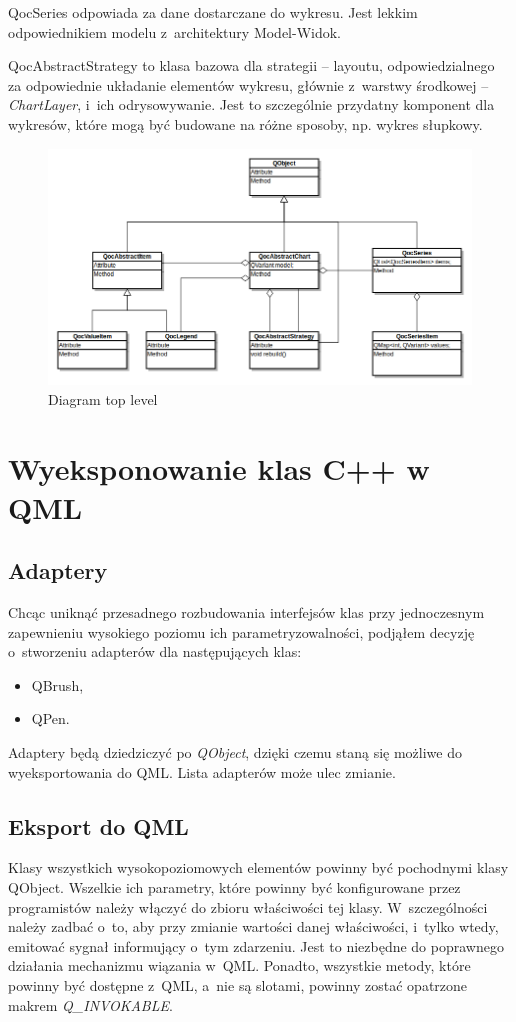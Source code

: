 QocSeries odpowiada za dane dostarczane do wykresu. Jest lekkim odpowiednikiem modelu z~architektury Model-Widok.

QocAbstractStrategy to klasa bazowa dla strategii -- layoutu, odpowiedzialnego za odpowiednie układanie elementów wykresu, głównie z~warstwy środkowej -- \textit{ChartLayer}, i~ich odrysowywanie. Jest to szczególnie przydatny komponent dla wykresów, które mogą być budowane na różne sposoby, np. wykres słupkowy.


\begin{figure}
\centering
\caption{Diagram top level}\label{rys:klasy:top_level}
\includegraphics[scale=0.5]{img/klasy-top_level.png}
\end{figure}


\section{Wyeksponowanie klas C++ w QML}
\subsection{Adaptery}
Chcąc uniknąć przesadnego rozbudowania interfejsów klas przy jednoczesnym zapewnieniu wysokiego poziomu ich parametryzowalności, podjąłem decyzję o~stworzeniu adapterów dla następujących klas:
\begin{itemize}  
\item{QBrush,}
\item{QPen.}
\end{itemize}
Adaptery będą dziedziczyć po \textit{QObject}, dzięki czemu staną się możliwe do wyeksportowania do QML. Lista adapterów może ulec zmianie.

\subsection{Eksport do QML}
Klasy wszystkich wysokopoziomowych elementów powinny być pochodnymi klasy QObject. Wszelkie ich parametry, które powinny być konfigurowane przez programistów należy włączyć do zbioru właściwości tej klasy. W~szczególności należy zadbać o~to, aby przy zmianie wartości danej właściwości, i~tylko wtedy, emitować sygnał informujący o~tym zdarzeniu. Jest to niezbędne do poprawnego działania mechanizmu wiązania w~QML. Ponadto, wszystkie metody, które powinny być dostępne z~QML, a~nie są slotami, powinny zostać opatrzone makrem \textit{Q\_INVOKABLE}.

